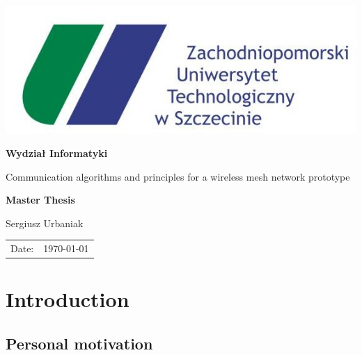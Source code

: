 \documentclass[pointlessnumbers, abstracton, headsepline, a4paper]{scrartcl}
\let\myTOC\tableofcontents
\renewcommand\tableofcontents{\myTOC\clearpage\pagenumbering{arabic}}
\begin{document}
\begin{titlepage}

\begin{center}
\includegraphics[scale=0.5]{logos/zut.jpg}
\par
\end{center}

\begin{center}
\textsf{\textbf{\LARGE Wydział Informatyki}}
\end{center}{\LARGE}

\vspace{3.5cm}

\begin{center}
\textsf{\Large Communication algorithms and principles for a wireless mesh network prototype}
\end{center}

\begin{center}
\textsf{\textbf{\Large Master Thesis}}
\end{center}

\begin{center}
\textsf{\large Sergiusz Urbaniak}
\end{center}

\vspace{5.5cm}

\begin{center}
\begin{tabular}{ll}
Date: & \today\tabularnewline
\end{tabular}
\end{center}

\end{titlepage}

\tableofcontents

\section{Introduction}
\subsection{Personal motivation}
\end{document}
